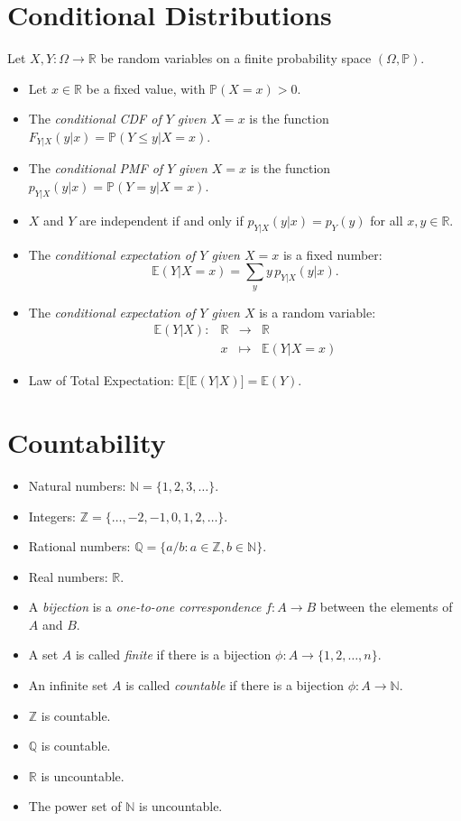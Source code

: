 \documentclass[lecture]{csm}
\newcommand{\prob}{\mathbb{P}}
\newcommand{\expe}{\mathbb{E}}
\newcommand{\N}{\mathbb{N}}
\newcommand{\Z}{\mathbb{Z}}
\newcommand{\Q}{\mathbb{Q}}
\newcommand{\R}{\mathbb{R}}
\def\it{\item}
\def\bit{\begin{itemize}}
\def\eit{\end{itemize}}
\begin{document}
\newpage
\section{Conditional Distributions}
Let $X,Y:\Omega\to\R$ be random variables on a finite probability space $(\Omega,\prob)$.
\bit
\it Let $x\in\R$ be a fixed value, with $\prob(X=x)>0$.
\it The \emph{conditional CDF of $Y$ given $X=x$} is the function $F_{Y|X}(y|x)=\prob(Y\leq y|X=x)$.
\it The \emph{conditional PMF of $Y$ given $X=x$} is the function $p_{Y|X}(y|x)=\prob(Y=y|X=x)$.
\it $X$ and $Y$ are independent if and only if $p_{Y|X}(y|x) = p_Y(y)$ for all $x,y\in\R$.
\it The \emph{conditional expectation of $Y$ given $X=x$} is a fixed number:
\[
\expe(Y|X=x) 
	= \sum_y y\,p_{Y|X}(y|x).
	\]
\it The \emph{conditional expectation of $Y$ given $X$} is a random variable:
\[\begin{array}{llll}
\expe(Y|X):	& \R 	& \to 		& \R \\
			& x		& \mapsto 	& \expe(Y|X=x)
\end{array}\]
\it Law of Total Expectation: $\expe\big[\expe(Y|X)\big] = \expe(Y)$.
\eit

\newpage
\section{Countability}

\bit
\it Natural numbers: $\N = \{1,2,3,\ldots\}$.
\it Integers: $\Z = \{\ldots,-2,-1,0,1,2,\ldots\}$.
\it Rational numbers: $\Q = \{a/b:a\in\Z,b\in\N\}$.
\it Real numbers: $\R$.
\eit

\vspace*{1ex}
\bit
\it A \emph{bijection} is a \emph{one-to-one correspondence} $f:A\to B$ between the elements of $A$ and $B$.
\it A set $A$ is called \emph{finite} if there is a bijection $\phi:A\to\{1,2,\ldots,n\}$.
\it An infinite set $A$ is called \emph{countable} if there is a bijection $\phi:A\to\N$.
\eit

\vspace*{1ex}
\bit
\it $\Z$ is countable.
\it $\Q$ is countable.
\it $\R$ is uncountable.
\it The power set of $\N$ is uncountable.
\eit
\newpage
\end{document}
